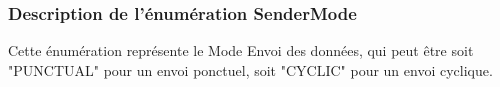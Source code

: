 \subsubsection{Description de l'énumération SenderMode}

Cette énumération représente le Mode Envoi des données, qui peut être soit "PUNCTUAL" pour un envoi ponctuel, soit "CYCLIC" pour un envoi cyclique.
\newline